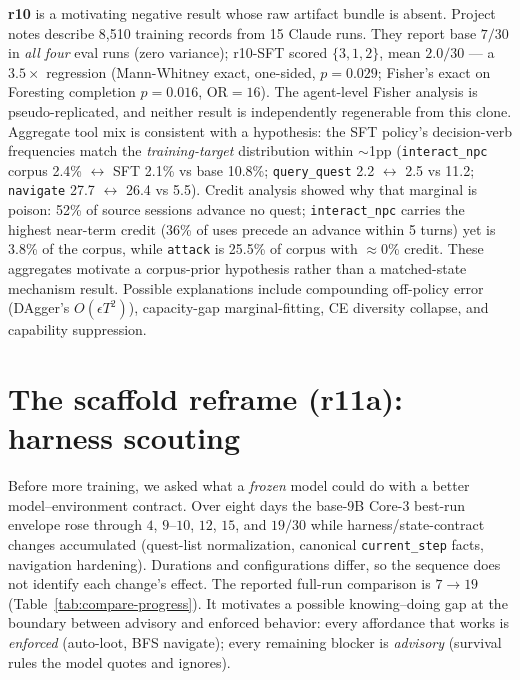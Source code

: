 \documentclass[11pt]{article}
\begin{document}
\textbf{r10} is a motivating negative result whose raw artifact bundle is absent. Project notes
describe 8{,}510 training records from 15 Claude runs. They report base $7/30$ in \emph{all
four} eval runs (zero variance); r10-SFT scored $\{3,1,2\}$, mean $2.0/30$ --- a $3.5\times$
regression (Mann-Whitney exact, one-sided, $p{=}0.029$; Fisher's exact on Foresting completion
$p{=}0.016$, OR$=16$). The agent-level Fisher analysis is pseudo-replicated, and neither result is
independently regenerable from this clone. Aggregate tool mix is consistent with a hypothesis: the SFT policy's
decision-verb frequencies match the \emph{training-target} distribution within $\sim$1pp
(\texttt{interact\_npc} corpus 2.4\% $\leftrightarrow$ SFT 2.1\% vs base 10.8\%;
\texttt{query\_quest} 2.2 $\leftrightarrow$ 2.5 vs 11.2; \texttt{navigate} 27.7 $\leftrightarrow$
26.4 vs 5.5). Credit analysis showed why that marginal is poison: 52\% of source sessions advance
no quest; \texttt{interact\_npc} carries the highest near-term credit (36\% of uses precede an
advance within 5 turns) yet is 3.8\% of the corpus, while \texttt{attack} is 25.5\% of corpus
with $\approx$0\% credit. These aggregates motivate a corpus-prior hypothesis rather than a
matched-state mechanism result. Possible explanations include compounding
off-policy error (DAgger's $O(\epsilon T^2)$), capacity-gap marginal-fitting, CE diversity
collapse, and capability suppression.

\section{The scaffold reframe (r11a): harness scouting}

Before more training, we asked what a \emph{frozen} model could do with a better
model--environment contract. Over eight days the base-9B Core-3 best-run envelope rose through
$4$, $9$--$10$, $12$, $15$, and $19/30$ while harness/state-contract changes accumulated
(quest-list normalization, canonical \texttt{current\_step} facts, navigation hardening).
Durations and configurations differ, so the sequence does not identify each change's effect. The
reported full-run comparison is $7 \rightarrow 19$ (Table~\ref{tab:compare-progress}). It motivates
a possible knowing--doing gap at the boundary
between advisory and enforced behavior: every affordance that works is \emph{enforced} (auto-loot, BFS navigate); every
remaining blocker is \emph{advisory} (survival rules the model quotes and ignores).
\end{document}
